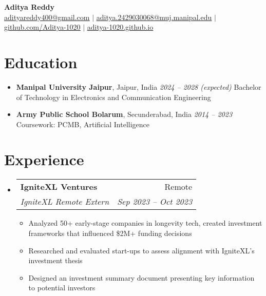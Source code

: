 \documentclass[letterpaper,11pt]{article}
\makeatletter
\newcommand{\resumeItem}[1]{
  \item\small{
    {#1 \vspace{-2pt}}
  }
}
\newcommand{\resumeSubheading}[4]{
  \vspace{-2pt}\item
    \begin{tabular*}{0.97\textwidth}[t]{l@{\extracolsep{\fill}}r}
      \textbf{#1} & #2 \\
      \textit{\small#3} & \textit{\small #4} \\
    \end{tabular*}\vspace{-7pt}
}
\newcommand{\resumeSubHeadingListStart}{\begin{itemize}[leftmargin=0.15in, label={}]}
\newcommand{\resumeSubHeadingListEnd}{\end{itemize}}
\newcommand{\resumeItemListStart}{\begin{itemize}}
\newcommand{\resumeItemListEnd}{\end{itemize}\vspace{-5pt}}
\makeatother
\begin{document}
\begin{center}
    \textbf{\Huge Aditya Reddy} \\ \vspace{1pt}
    \small \href{mailto:adityareddy400@gmail.com}{\underline{adityareddy400@gmail.com}} $|$ 
    \href{mailto:aditya.2429030068@muj.manipal.edu}{\underline{aditya.2429030068@muj.manipal.edu}} $|$
    \href{https://github.com/Aditya-1020}{\underline{github.com/Aditya-1020}} $|$
    \href{https://aditya-1020.github.io}{\underline{aditya-1020.github.io}}
\end{center}

\section{Education}
\begin{itemize}[leftmargin=*, itemsep=1pt]
  \item \textbf{Manipal University Jaipur}, Jaipur, India \hfill \textit{2024 -- 2028 (expected)}  
  \newline Bachelor of Technology in Electronics and Communication Engineering
  \item \textbf{Army Public School Bolarum}, Secunderabad, India \hfill \textit{2014 -- 2023}  
  \newline Coursework: PCMB, Artificial Intelligence
\end{itemize}

\section{Experience}
  \resumeSubHeadingListStart

    \resumeSubheading
      {IgniteXL Ventures}{Remote}
      {IgniteXL Remote Extern}{Sep 2023 -- Oct 2023}
      \resumeItemListStart
        \resumeItem{Analyzed 50+ early-stage companies in longevity tech, created investment frameworks that influenced \$2M+ funding decisions}
        \resumeItem{Researched and evaluated start-ups to assess alignment with IgniteXL’s investment thesis}
        \resumeItem{Designed an investment summary document presenting key information to potential investors}
      \resumeItemListEnd

  \resumeSubHeadingListEnd

\end{document}
